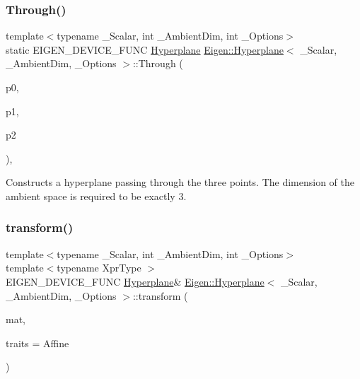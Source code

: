 \subsubsection{\texorpdfstring{Through()}{Through()}\hspace{0.1cm}{\footnotesize\ttfamily [2/2]}}
{\footnotesize\ttfamily template$<$typename \+\_\+\+Scalar, int \+\_\+\+Ambient\+Dim, int \+\_\+\+Options$>$ \\
static E\+I\+G\+E\+N\+\_\+\+D\+E\+V\+I\+C\+E\+\_\+\+F\+U\+NC \mbox{\hyperlink{class_eigen_1_1_hyperplane}{Hyperplane}} \mbox{\hyperlink{class_eigen_1_1_hyperplane}{Eigen\+::\+Hyperplane}}$<$ \+\_\+\+Scalar, \+\_\+\+Ambient\+Dim, \+\_\+\+Options $>$\+::Through (\begin{DoxyParamCaption}\item[{const \mbox{\hyperlink{class_eigen_1_1_matrix}{Vector\+Type}} \&}]{p0,  }\item[{const \mbox{\hyperlink{class_eigen_1_1_matrix}{Vector\+Type}} \&}]{p1,  }\item[{const \mbox{\hyperlink{class_eigen_1_1_matrix}{Vector\+Type}} \&}]{p2 }\end{DoxyParamCaption})\hspace{0.3cm}{\ttfamily [inline]}, {\ttfamily [static]}}

Constructs a hyperplane passing through the three points. The dimension of the ambient space is required to be exactly 3. \mbox{\label{class_eigen_1_1_hyperplane_a44d7ad009a496f78636ce69f611f2003}} 
\subsubsection{\texorpdfstring{transform()}{transform()}\hspace{0.1cm}{\footnotesize\ttfamily [1/2]}}
{\footnotesize\ttfamily template$<$typename \+\_\+\+Scalar, int \+\_\+\+Ambient\+Dim, int \+\_\+\+Options$>$ \\
template$<$typename Xpr\+Type $>$ \\
E\+I\+G\+E\+N\+\_\+\+D\+E\+V\+I\+C\+E\+\_\+\+F\+U\+NC \mbox{\hyperlink{class_eigen_1_1_hyperplane}{Hyperplane}}\& \mbox{\hyperlink{class_eigen_1_1_hyperplane}{Eigen\+::\+Hyperplane}}$<$ \+\_\+\+Scalar, \+\_\+\+Ambient\+Dim, \+\_\+\+Options $>$\+::transform (\begin{DoxyParamCaption}\item[{const \mbox{\hyperlink{class_eigen_1_1_matrix_base}{Matrix\+Base}}$<$ Xpr\+Type $>$ \&}]{mat,  }\item[{\mbox{\hyperlink{group__enums_gaee59a86102f150923b0cac6d4ff05107}{Transform\+Traits}}}]{traits = {\ttfamily Affine} }\end{DoxyParamCaption})\hspace{0.3cm}{\ttfamily [inline]}}

